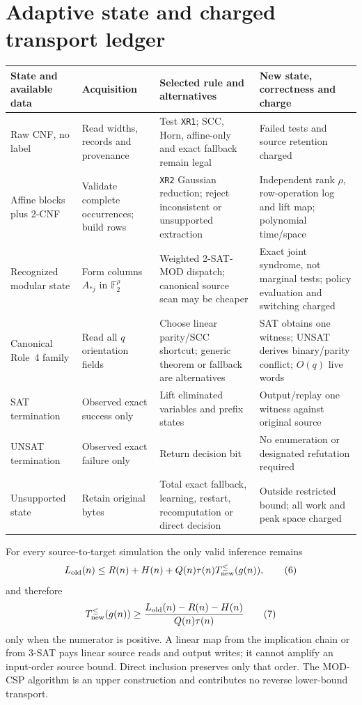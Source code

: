 \documentclass[11pt]{article}
\begin{document}
\section{Adaptive state and charged transport ledger}
\small
\begin{longtable}{p{.17\linewidth}p{.20\linewidth}p{.27\linewidth}p{.26\linewidth}}
\toprule
State and available data & Acquisition & Selected rule and alternatives & New state, correctness and charge\\\midrule\endhead
Raw CNF, no label & Read widths, records and provenance & Test \texttt{XR1}; SCC, Horn, affine-only and exact fallback remain legal & Failed tests and source retention charged\\
Affine blocks plus 2-CNF & Validate complete occurrences; build rows & \texttt{XR2} Gaussian reduction; reject inconsistent or unsupported extraction & Independent rank $\rho$, row-operation log and lift map; polynomial time/space\\
Recognized modular state & Form columns $A_{*j}$ in $\mathbb F_2^\rho$ & Weighted 2-SAT-MOD dispatch; canonical source scan may be cheaper & Exact joint syndrome, not marginal tests; policy evaluation and switching charged\\
Canonical Role~4 family & Read all $q$ orientation fields & Choose linear parity/SCC shortcut; generic theorem or fallback are alternatives & SAT obtains one witness; UNSAT derives binary/parity conflict; $O(q)$ live words\\
SAT termination & Observed exact success only & Lift eliminated variables and prefix states & Output/replay one witness against original source\\
UNSAT termination & Observed exact failure only & Return decision bit & No enumeration or designated refutation required\\
Unsupported state & Retain original bytes & Total exact fallback, learning, restart, recomputation or direct decision & Outside restricted bound; all work and peak space charged\\
\bottomrule
\end{longtable}
\normalsize

For every source-to-target simulation the only valid inference remains
\[
L_{\rm old}(n)\le R(n)+H(n)+Q(n)\tau(n)
T_{\rm new}^{\le}(g(n)),                              \tag{6}
\]
and therefore
\[
T_{\rm new}^{\le}(g(n))\ge
\frac{L_{\rm old}(n)-R(n)-H(n)}{Q(n)\tau(n)}          \tag{7}
\]
only when the numerator is positive.  A linear map from the implication
chain or from 3-SAT pays linear source reads and output writes; it cannot
amplify an input-order source bound.  Direct inclusion preserves only that
order.  The MOD-CSP algorithm is an upper construction and contributes no
reverse lower-bound transport.
\end{document}
